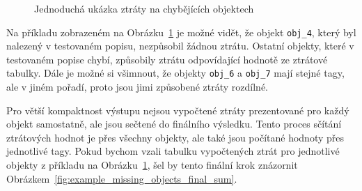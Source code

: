 \begin{figure}[H]
	\caption{Jednoduchá ukázka ztráty na chybějících objektech}\label{fig:example_missing_objects}
\end{figure}
Na příkladu zobrazeném na Obrázku~\ref{fig:example_missing_objects} je možné vidět, že objekt \texttt{obj\_4},
který byl nalezený v testovaném popisu, nezpůsobil žádnou ztrátu.
Ostatní objekty, které v testovaném popise chybí, způsobily ztrátu odpovídající hodnotě ze ztrátové tabulky.
Dále je možné si všimnout, že objekty \texttt{obj\_6} a \texttt{obj\_7} mají stejné tagy, ale v jiném pořadí, proto jsou jimi způsobené ztráty rozdílné.

Pro větší kompaktnost výstupu nejsou vypočtené ztráty prezentované pro každý objekt samostatně, ale jsou sečtené do finálního výsledku.
Tento proces sčítání ztrátových hodnot je přes všechny objekty, ale také jsou počítané hodnoty přes jednotlivé tagy.
Pokud bychom vzali tabulku vypočtených ztrát pro jednotlivé objekty z příkladu na Obrázku~\ref{fig:example_missing_objects},
šel by tento finální krok znázornit Obrázkem~\ref{fig:example_missing_objects_final_sum}.

